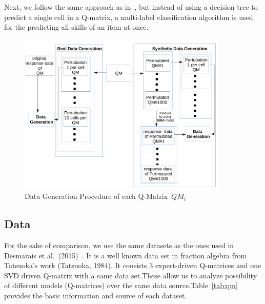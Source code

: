 \documentclass[11pt]{article}
\begin{document}
Next, we follow the same approach as in~\cite{desmarais2015combining}, but instead of using a decision tree to predict a single cell in a Q-matrix, a multi-label classification algorithm is used for the predicting all skills of an item at once. 
\begin{figure}
  \centering
    \includegraphics[width=100mm ,scale=0.5]{graph/DG.pdf}
  \caption{Data Generation Procedure of each Q-Matrix~$QM_i$}  \label{fig:DG}
\end{figure}
 
\subsection{Data}
For the sake of comparison, we use the same datasets as the ones used in Desmarais et al.\ (2015)~\cite{tatsuoka1983rule,desmarais2015combining}. It is a well known data set in
fraction algebra from Tatsuoka's work (Tatsuoka, 1984)\cite{tatsuoka1983rule}. It consists 3 expert-driven Q-matrices and one SVD driven Q-matrix with a same data set.These allow us to analyze possibility of different models (Q-matrices) over the same data source.Table~\ref{tab:qm} provides the basic information and source of each dataset.   
\end{document}
